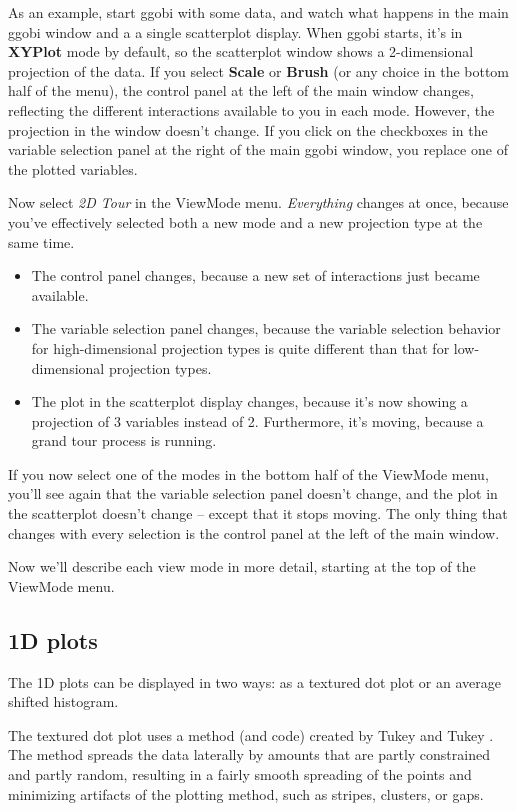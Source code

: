 \documentclass[11pt]{article}
\begin{document}
As an example, start ggobi with some data, and watch what happens
in the main ggobi window and a a single scatterplot display.   When ggobi
starts, it's in {\bf XYPlot} mode by default, so the scatterplot window shows
a 2-dimensional projection of the data.  If you select {\bf Scale} or
{\bf Brush} (or any choice in the bottom half of the menu), the control
panel at the left of the main window changes, reflecting the different
interactions available to you in each mode.  However, the projection in
the window doesn't change.  If you click on the checkboxes in the
variable selection panel at the right of the main ggobi window, you
replace one of the plotted variables.

Now select {\em 2D Tour} in the ViewMode menu.  {\em Everything}
changes at once, because you've effectively selected both a new mode and
a new projection type at the same time.
\begin{itemize}
\itemsep 0em
\item The control panel changes, because a new set of interactions
      just became available.
\item The variable selection panel changes, because the variable
      selection behavior for high-dimensional projection types is
      quite different than that for low-dimensional projection types.
\item The plot in the scatterplot display changes, because it's
      now showing a projection of 3 variables instead of 2.  Furthermore,
      it's moving, because a grand tour process is running.
\end{itemize}

If you now select one of the modes in the bottom half of the ViewMode
menu, you'll see again that the variable selection panel doesn't
change, and the plot in the scatterplot doesn't change -- except
that it stops moving.  The only thing that changes with every
selection is the control panel at the left of the main window.

Now we'll describe each view mode in more detail, starting at the
top of the ViewMode menu. 

\subsection{1D plots}

The 1D plots can be displayed in two ways:  as a textured dot plot
or an average shifted histogram.

The textured dot plot uses a method (and code) created by Tukey and Tukey
\cite{TukeyTukey90}.  The method spreads the data laterally by
amounts that are partly constrained and partly random, resulting in a
fairly smooth spreading of the points and minimizing artifacts of the
plotting method, such as stripes, clusters, or gaps.
\end{document}
